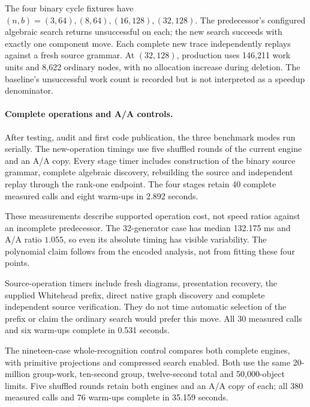 The four binary cycle fixtures have $(n,b)=(3,64),(8,64),(16,128),(32,128)$.
The predecessor's configured algebraic search returns unsuccessful on each;
the new search succeeds with exactly one component move. Each complete new
trace independently replays against a fresh source grammar. At $(32,128)$,
production uses 146,211 work units and 8,622 ordinary nodes, with no allocation
increase during deletion. The baseline's unsuccessful work count is recorded
but is not interpreted as a speedup denominator.

\paragraph{Complete operations and A/A controls.}
After testing, audit and first code publication, the three benchmark modes
run serially. The new-operation timings use five shuffled rounds of the
current engine and an A/A copy. Every stage timer includes construction of
the binary source grammar, complete algebraic discovery, rebuilding the source
and independent replay through the rank-one endpoint. The four stages retain
40 complete measured calls and eight warm-ups in 2.892 seconds.



These measurements describe supported operation cost, not speed ratios against
an incomplete predecessor. The 32-generator case has median 132.175 ms and
A/A ratio $1.055$, so even its absolute timing has visible variability. The
polynomial claim follows from the encoded analysis, not from fitting these
four points.

Source-operation timers include fresh diagrams, presentation recovery, the
supplied Whitehead prefix, direct native graph discovery and complete independent
source verification. They do not time automatic selection of the prefix or
claim the ordinary search would prefer this move. All 30 measured calls and
six warm-ups complete in 0.531 seconds.



The nineteen-case whole-recognition control compares both complete engines,
with primitive projections and compressed search enabled. Both use the same
20-million group-work, ten-second group, twelve-second total and 50,000-object
limits. Five shuffled rounds retain both engines and an A/A copy of each;
all 380 measured calls and 76 warm-ups complete in 35.159 seconds.



